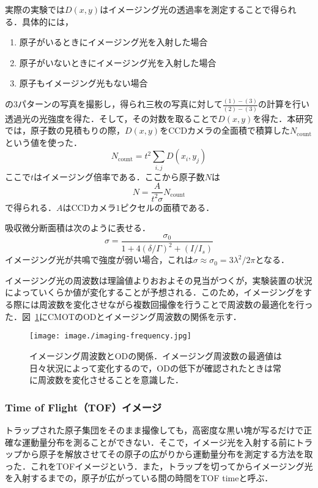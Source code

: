 \documentclass[11pt,a4j,notitlepage]{jreport}
\newcommand{\fig}[1]{図~\ref{#1}}	%
\begin{document}
実際の実験では$D(x, y)$はイメージング光の透過率を測定することで得られる．具体的には，
\begin{enumerate}
\renewcommand{\labelenumi}{(\arabic{enumi})}
	\item 原子がいるときにイメージング光を入射した場合
	\item 原子がいないときにイメージング光を入射した場合
	\item 原子もイメージング光もない場合
\end{enumerate}
の$3$パターンの写真を撮影し，得られ三枚の写真に対して$\frac{(1)-(3)}{(2)-(3)}$の計算を行い透過光の光強度を得た．そして，その対数を取ることで$D(x, y)$を得た．本研究では，原子数の見積もりの際，$D(x, y)$をCCDカメラの全面積で積算した$N_{\mathrm{count}}$という値を使った．
\begin{equation}
	N_{\mathrm{count}} = t^2 \sum_{i, j} D(x_i, y_j)
	\label{eq3.3.4}
\end{equation}
ここで$t$はイメージング倍率である．ここから原子数$N$は
\begin{equation}
	N=\frac{A}{t^2 \sigma} N_{\mathrm{count}} 
	\label{eq3.3.5}
\end{equation}
で得られる．$A$はCCDカメラ$1$ピクセルの面積である．

吸収微分断面積は次のように表せる．
\begin{equation}
	\sigma=\frac{\sigma_{0}}{1+4(\delta / \Gamma)^{2}+\left(I / I_{s}\right)}
	\label{eq3.3.6}
\end{equation}
イメージング光が共鳴で強度が弱い場合，これは$\sigma \approx \sigma_{0} = 3 \lambda^{2}/2 \pi$となる．

イメージング光の周波数は理論値よりおおよその見当がつくが，実験装置の状況によっていくらか値が変化することが予想される．このため，イメージングをする際には周波数を変化させながら複数回撮像を行うことで周波数の最適化を行った．\fig{fig3.3.11}にCMOTのODとイメージング周波数の関係を示す．
\begin{figure}[H]
	\centering
		\texttt{[image: image./imaging-frequency.jpg]}
	\caption{イメージング周波数とODの関係．イメージング周波数の最適値は日々状況によって変化するので，ODの低下が確認されたときは常に周波数を変化させることを意識した．}
	\label{fig3.3.11}
\end{figure}

\subsubsection{Time of Flight（TOF）イメージ}
トラップされた原子集団をそのまま撮像しても，高密度な黒い塊が写るだけで正確な運動量分布を測ることができない．そこで，イメージ光を入射する前にトラップから原子を解放させてその原子の広がりから運動量分布を測定する方法を取った．これをTOFイメージという．また，トラップを切ってからイメージング光を入射するまでの，原子が広がっている間の時間をTOF timeと呼ぶ．
\end{document}
